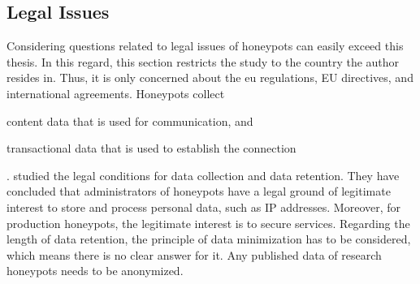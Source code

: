 \subsection{Legal Issues}

Considering questions related to legal issues of honeypots can easily exceed this thesis.
In this regard, this section restricts the study to the country the author resides in.
Thus, it is only concerned about the \ac{eu} regulations, EU directives, and international agreements.
Honeypots collect
\begin{enumerate*}[label=(\roman*)]
    \item content data that is used for communication, and
    \item transactional data that is used to establish the connection
\end{enumerate*}.
\citet{sokol2017} studied the legal conditions for data collection and data retention.
They have concluded that administrators of honeypots have a legal ground of legitimate interest to store and process personal data, such as IP addresses.
Moreover, for production honeypots, the legitimate interest is to secure services.
Regarding the length of data retention, the principle of data minimization has to be considered, which means there is no clear answer for it.
Any published data of research honeypots needs to be anonymized.
